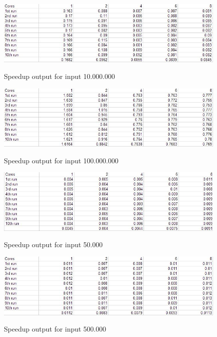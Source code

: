\begin{figure}[h!]
\centering
\caption{Speedup output for input 10.000.000}
\includegraphics[width=\linewidth]{Images/oo2-1-2-SU10000000}
\label{Speedup10.000.000}
\end{figure}

\begin{figure}[h!]
\centering
\caption{Speedup output for input 100.000.000}
\includegraphics[width=\linewidth]{Images/oo2-1-2-SU100000000}
\label{Speedup100.000.000}
\end{figure}

\begin{figure}[h!]
\centering
\caption{Speedup output for input 50.000}
\includegraphics[width=\linewidth]{Images/oo2-1-2-SU50000}
\label{Speedup50.000}
\end{figure}

\begin{figure}[h!]
\centering
\caption{Speedup output for input 500.000}
\includegraphics[width=\linewidth]{Images/oo2-1-2-SU500000}
\label{Speedup500.000}
\end{figure}

